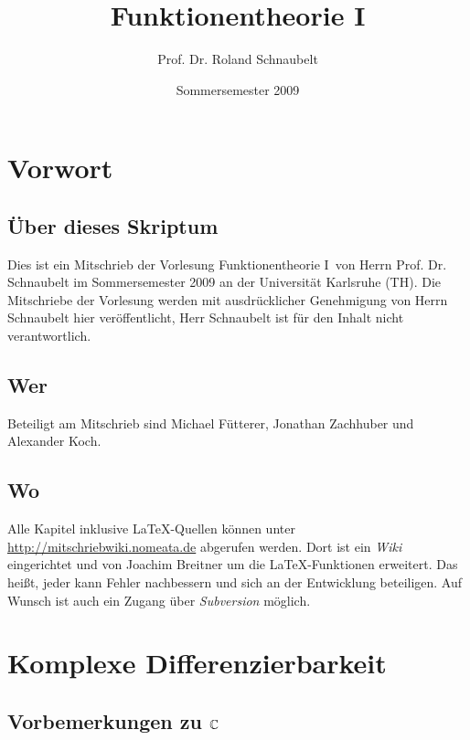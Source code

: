\documentclass[a4paper,twoside,DIV15,BCOR12mm]{scrbook}
\author{Prof. Dr. Roland Schnaubelt}
\title{Funktionentheorie I}
\date{Sommersemester 2009}
\begin{document}
\maketitle

\chapter*{Vorwort}

\section*{Über dieses Skriptum}
Dies ist ein Mitschrieb der Vorlesung \glqq Funktionentheorie I\grqq\
von Herrn Prof. Dr. Schnaubelt im Sommersemester 2009 an der Universität Karlsruhe (TH).
Die Mitschriebe der Vorlesung werden mit ausdrücklicher Genehmigung von Herrn Schnaubelt hier veröffentlicht,
Herr Schnaubelt ist für den Inhalt nicht verantwortlich.

\section*{Wer}
Beteiligt am Mitschrieb sind Michael Fütterer, Jonathan Zachhuber und
Alexander Koch.

\section*{Wo}
Alle Kapitel inklusive \LaTeX-Quellen können unter \url{http://mitschriebwiki.nomeata.de} abgerufen werden.
Dort ist ein \emph{Wiki} eingerichtet und von Joachim Breitner um die \LaTeX-Funktionen erweitert.
Das heißt, jeder kann Fehler nachbessern und sich an der Entwicklung
beteiligen. Auf Wunsch ist auch ein Zugang über \emph{Subversion} möglich.


\tableofcontents




\chapter{Komplexe Differenzierbarkeit}

\section{Vorbemerkungen zu $\mathbb{C}$}


\end{document}
